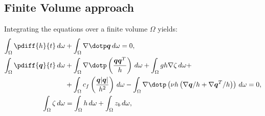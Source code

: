 \subsection*{Finite Volume approach}
Integrating the equations over a finite volume $\Omega$ yields:
\begin{subequations}
\begin{align}
    \int_\Omega \pdiff{h}{t}\, d\omega &
    + \int_\Omega \nabla \dotp \vec{q}\, d\omega  = 0,
    \label{eq:pressure_dependent_on_zeta_a}
    \\
    \int_\Omega \pdiff{\vec{q}}{t}\, d\omega &
    + \int_\Omega \nabla \dotp \left( \frac{\vec{q}\vec{q}^T}{h} \right)\, d\omega
    + \int_\Omega gh \nabla \zeta\, d\omega +
    \nonumber \\
    & + \int_\Omega c_f \left( \frac{\vec{q}\abs{\vec{q}}}{h^2} \right)\, d\omega
    - \int_\Omega \nabla \dotp \left( \nu h \left(  \nabla \vec{q}/h + \nabla \vec{q}^T/h \right) \right)\, d\omega = 0,
    \label{eq:pressure_dependent_on_zeta_b}
    \\
    \int_\Omega \zeta\, d\omega &
    = \int_\Omega h\, d\omega + \int_\Omega z_b\, d\omega,
    \label{eq:pressure_dependent_on_zeta_c}
\end{align}
\label{eq:pressure_dependent_on_zeta}
\end{subequations}

